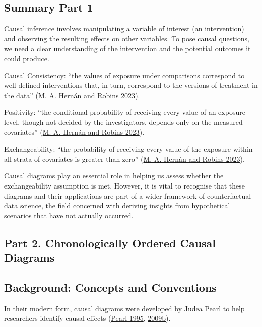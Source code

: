 \documentclass[
  singlecolumn]{report}
\begin{document}
\hypertarget{summary-part-1}{%
\subsection{Summary Part 1}\label{summary-part-1}}

Causal inference involves manipulating a variable of interest (an
intervention) and observing the resulting effects on other variables. To
pose causal questions, we need a clear understanding of the intervention
and the potential outcomes it could produce.

Causal Consistency: ``the values of exposure under comparisons
correspond to well-defined interventions that, in turn, correspond to
the versions of treatment in the data''
(\protect\hyperlink{ref-hernuxe1n2023a}{M. A. Hernán and Robins 2023}).

Positivity: ``the conditional probability of receiving every value of an
exposure level, though not decided by the investigators, depends only on
the measured covariates'' (\protect\hyperlink{ref-hernuxe1n2023a}{M. A.
Hernán and Robins 2023}).

Exchangeability: ``the probability of receiving every value of the
exposure within all strata of covariates is greater than zero''
(\protect\hyperlink{ref-hernuxe1n2023a}{M. A. Hernán and Robins 2023}).

Causal diagrams play an essential role in helping us assess whether the
exchangeability assumption is met. However, it is vital to recognise
that these diagrams and their applications are part of a wider framework
of counterfactual data science, the field concerned with deriving
insights from hypothetical scenarios that have not actually occurred.

\hypertarget{part-2.-chronologically-ordered-causal-diagrams}{%
\subsection{Part 2. Chronologically Ordered Causal
Diagrams}\label{part-2.-chronologically-ordered-causal-diagrams}}

\hypertarget{background-concepts-and-conventions}{%
\subsection{Background: Concepts and
Conventions}\label{background-concepts-and-conventions}}

In their modern form, causal diagrams were developed by Judea Pearl to
help researchers identify causal effects
(\protect\hyperlink{ref-pearl1995}{Pearl 1995},
\protect\hyperlink{ref-pearl2009a}{2009b}).
\end{document}
